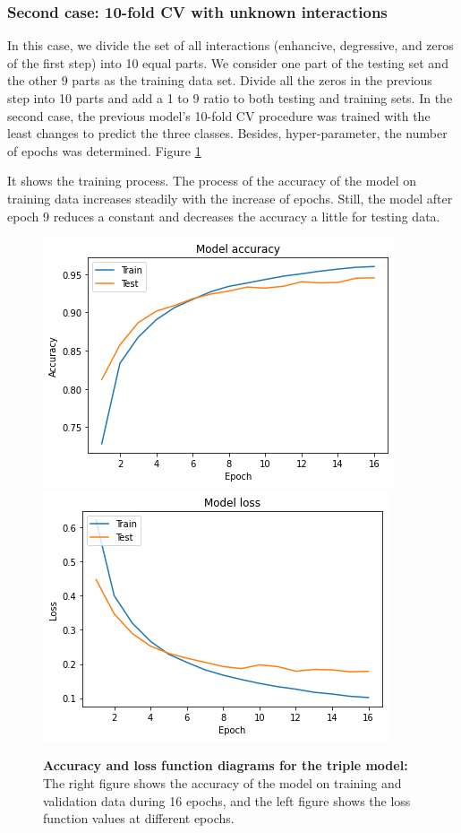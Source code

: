 \documentclass{bmcart}
\begin{document}
\subsubsection*{Second case: 10-fold CV with unknown interactions}
In this case, we divide the set of all interactions (enhancive, degressive, and zeros of the first step) into 10 equal parts. We consider one part of the testing set and the other 9 parts as the training data set. Divide all the zeros in the previous step into 10 parts and add a 1 to 9 ratio to both testing and training sets. In the second case, the previous model's 10-fold CV procedure was trained with the least changes to predict the three classes. Besides, hyper-parameter, the number of epochs was determined. Figure
\ref{lastTripleModel} 

It shows the training process. The process of the accuracy of the model on training data increases steadily with the increase of epochs. Still, the model after epoch 9 reduces a constant and decreases the accuracy a little for testing data.

\begin{figure}[!h]
	\begin{minipage}{1\linewidth}
		\includegraphics[width=.48\textwidth]{lastTripleModel/modelTripleACC.png}
		\includegraphics[width=.48\textwidth]{lastTripleModel/modelTripleLoss.png}
	\end{minipage}
	\caption{\textbf{Accuracy and loss function diagrams for the triple model:} The right figure shows the accuracy of the model on training and validation data during 16 epochs, and the left figure shows the loss function values at different epochs.}
	\label{lastTripleModel}
\end{figure}
\end{document}
